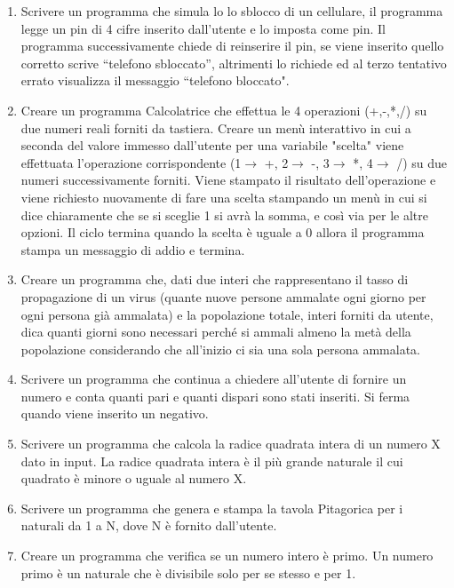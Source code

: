 \documentclass{article}
\begin{document}
\begin{enumerate}
\item Scrivere un programma che simula lo lo sblocco di un cellulare, il programma legge un pin di 4 cifre inserito dall’utente e lo imposta come pin. Il programma successivamente chiede di reinserire il pin, se viene inserito quello corretto scrive “telefono sbloccato”, altrimenti lo richiede ed al terzo tentativo errato visualizza il messaggio “telefono bloccato".

\item Creare un programma Calcolatrice che effettua le 4 operazioni (+,-,*,/) su due numeri reali forniti da tastiera. Creare un menù interattivo in cui a seconda del valore immesso dall'utente per una variabile "scelta" viene effettuata l'operazione corrispondente (1$\rightarrow$ +, 2$\rightarrow$ -, 3$\rightarrow$ *, 4$\rightarrow$ /) su due numeri successivamente forniti. Viene stampato il risultato dell'operazione e viene richiesto nuovamente di fare una scelta stampando un menù in cui si dice chiaramente che se si sceglie 1 si avrà la somma, e così via per le altre opzioni. Il ciclo termina quando la scelta è uguale a 0 allora il programma stampa un messaggio di addio e termina.

\item Creare un programma che, dati due interi che rappresentano il tasso di propagazione di un virus (quante nuove persone ammalate ogni giorno per ogni persona già ammalata) e la popolazione totale, interi forniti da utente, dica quanti giorni sono necessari perché si ammali almeno la metà della popolazione considerando che all’inizio ci sia una sola persona ammalata.

\item Scrivere un programma che continua a chiedere all'utente di fornire un numero e conta quanti pari e quanti dispari sono stati inseriti. Si ferma quando viene inserito un negativo.

\item Scrivere un programma che calcola la radice quadrata intera di un numero X dato in input. La radice quadrata intera è il più grande naturale il cui quadrato è minore o uguale al numero X.

\item Scrivere un programma che genera e stampa la tavola Pitagorica per i naturali da 1 a N, dove N è fornito dall'utente.

\item Creare un programma che verifica se un numero intero è primo. Un numero primo è un naturale che è divisibile solo per se stesso e per 1.


\end{enumerate}
\end{document}

